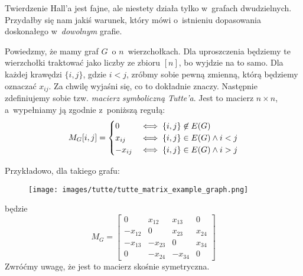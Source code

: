 Twierdzenie Hall'a jest fajne, ale niestety działa tylko w~grafach dwudzielnych. Przydałby się nam jakiś warunek, który mówi o~istnieniu dopasowania doskonałego w~\emph{dowolnym} grafie.

Powiedzmy, że mamy graf \(G\)~o \(n\)~wierzchołkach. Dla uproszczenia będziemy te wierzchołki traktować jako liczby ze zbioru \([n]\), bo wyjdzie na to samo. Dla każdej krawędzi \(\{i, j\}\), gdzie \(i < j\), zróbmy sobie pewną zmienną, którą będziemy oznaczać \(x_{ij}\). Za chwilę wyjaśni się, co to dokładnie znaczy. Następnie zdefiniujemy sobie tzw. \emph{macierz symboliczną Tutte'a}. Jest to macierz \(n \times n\), a~wypełniamy ją zgodnie z~poniższą regułą:
\begin{equation*}
	M_G[i, j] = \begin{cases}
		0       & \iff \{i, j\} \not\in E\pars{G}         \\
		x_{ij}  & \iff \{i, j\} \in E\pars{G} \land i < j \\
		-x_{ij} & \iff \{i, j\} \in E\pars{G} \land i > j
	\end{cases}
\end{equation*}

Przykładowo, dla takiego grafu:
\begin{figure}[H]
	\centering
	\texttt{[image: images/tutte/tutte\_matrix\_example\_graph.png]}
\end{figure}

będzie
\begin{equation*}
	M_G = \begin{bmatrix}
		0       & x_{12}  & x_{13}  & 0      \\
		-x_{12} & 0       & x_{23}  & x_{24} \\
		-x_{13} & -x_{23} & 0       & x_{34} \\
		0       & -x_{24} & -x_{34} & 0
	\end{bmatrix}
\end{equation*}
Zwróćmy uwagę, że jest to macierz skośnie symetryczna.

